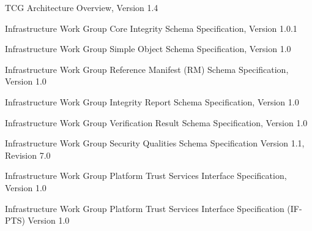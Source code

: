 \documentclass[12pt,a4paper]{article}
\begin{document}
\clearpage 



\begin{thebibliography}{9}



  TCG Architecture Overview, Version 1.4

  Infrastructure Work Group Core Integrity Schema Specification, Version 1.0.1

  Infrastructure Work Group Simple Object Schema Specification, Version 1.0

  Infrastructure Work Group Reference Manifest (RM) Schema Specification, Version 1.0

  Infrastructure Work Group Integrity Report Schema Specification, Version 1.0

  Infrastructure Work Group Verification Result Schema Specification, Version 1.0 

  Infrastructure Work Group Security Qualities Schema Specification Version 1.1, Revision 7.0


  Infrastructure Work Group Platform Trust Services Interface Specification, Version 1.0

  Infrastructure Work Group Platform Trust Services Interface Specification (IF-PTS) Version 1.0


\end{thebibliography}
\end{document}
